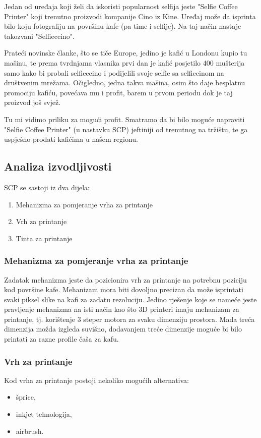\documentclass[12pt]{article}
\begin{document}
Jedan od uređaja koji želi da iskoristi popularnost selfija jeste "Selfie Coffee Printer" koji trenutno proizvodi kompanije Cino iz Kine. Uređaj može da isprinta bilo koju fotografiju na površinu kafe (pa time i selfije). Na taj način nastaje takozvani "Selfieccino". 

Prateći novinske članke, što se tiče Europe, jedino je kafić u Londonu kupio tu mašinu, te prema tvrdnjama vlasnika prvi dan je kafić posjetilo 400 mušterija samo kako bi probali selfieccino i podijelili svoje selfie sa selficcinom na društvenim mre\v{z}ama. Očigledno, jedna takva mašina, osim što daje besplatnu promociju kafiću, povećava mu i profit, barem u prvom periodu dok je taj proizvod još svjež.

Tu mi vidimo priliku za mogući profit. Smatramo da bi bilo moguće napraviti "Selfie Coffee Printer" (u nastavku SCP) jeftiniji od trenutnog na tržištu, te ga uspješno prodati kafićima u našem regionu.

\subsection{Analiza izvodljivosti}
SCP se sastoji iz dva dijela:
\begin{enumerate}
\item Mehanizma za pomjeranje vrha za printanje
\item Vrh za printanje
\item Tinta za printanje
\end{enumerate}

\newpage

\subsubsection{Mehanizma za pomjeranje vrha za printanje}
Zadatak mehanizma jeste da pozicionira vrh za printanje na potrebnu poziciju kod površine kafe. Mehanizam mora biti dovoljno precizan da može isprintati svaki piksel slike na kafi za zadatu rezoluciju. Jedino rješenje koje se nameće jeste pravljenje mehanizma na isti način kao što 3D printeri imaju mehanizam za printanje, tj. korištenje 3 steper motora za svaku dimenziju prostora. Mada treća dimenzija možda izgleda suvišno, dodavanjem treće dimenzije moguće bi bilo printati za razne profile čaša za kafu.

\subsubsection{Vrh za printanje}
Kod vrha za printanje postoji nekoliko mogućih alternativa:
\begin{itemize}
\item šprice,
\item inkjet tehnologija,
\item airbrush.
\end{itemize}
\end{document}
